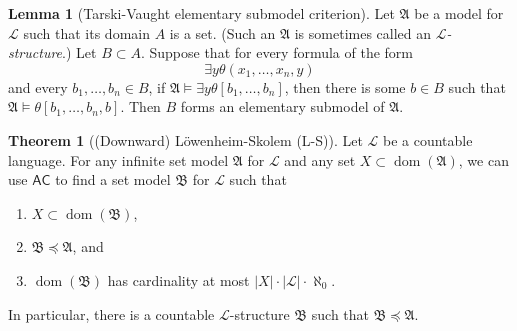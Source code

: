 \documentclass[10pt,letterpaper,cm]{nupset}
\theoremstyle{definition}
\theoremstyle{theorem}
\newtheorem{theorem}[definition]{Theorem}
\newtheorem{lemma}[definition]{Lemma}
\theoremstyle{remark}
\newcommand{\A}{\mathfrak A}
\renewcommand{\L}{\mathcal L}
\newcommand{\B}{\mathfrak{B}}
\newcommand{\1}{\mathbf{1}}
\newcommand{\0}{\vec 0}
\newcommand{\ac}{\mathsf{AC}}
\DeclareMathOperator{\dom}{dom}
\newcommand{\be}{\begin{enumerate}}
\newcommand{\ee}{\end{enumerate}}
\begin{document}
\begin{lemma}[Tarski-Vaught elementary submodel criterion]\label{TV}
Let $\A$ be a model for $\L$ such that its domain $A$ is a set. (Such an $\A$ is sometimes called an \textit{$\L$-structure}.) Let $B \subset A$. Suppose that for every formula of the form $$\exists y \theta(x_1, \ldots, x_n, y)$$ and every $b_1, \ldots, b_n \in B$, if $\A \models \exists y \theta[b_1, \ldots, b_n]$, then there is some $b \in B$ such that $\A \models \theta[b_1, \ldots, b_n, b]$.
Then $B$ forms an elementary submodel of $\A$. 
\end{lemma}

\begin{theorem}[(Downward) L\"owenheim-Skolem (L-S)]\label{LS}
Let $\L$ be a countable language. For any infinite set model $\A$ for $\L$ and any set $X\subset \dom(\A)$, we can use $\ac$ to find a set model $\B$ for $\L$ such that 
\be[label=(\alph*)]
\item $X\subset \dom(\B)$, 
\item $\B \preceq \A$, and
\item $\dom(\B)$ has cardinality at most $\left\lvert{X}\right\rvert \cdot \left\lvert{\L}\right\rvert \cdot \aleph_0$.
\ee 
In particular, there is a countable $\L$-structure $\B$ such that $\B \preceq \A$.
\end{theorem}
\end{document}
